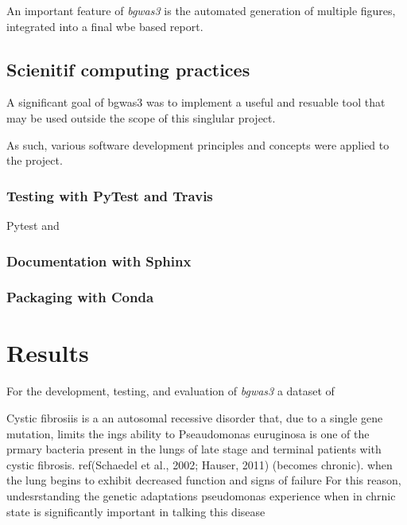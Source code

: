 \documentclass[]{DissertateUSU}
\begin{document}
An important feature of \emph{bgwas3} is the automated generation of
multiple figures, integrated into a final wbe based report.

\hypertarget{scienitif-computing-practices}{%
\subsection{Scienitif computing
practices}\label{scienitif-computing-practices}}

A significant goal of bgwas3 was to implement a useful and resuable tool
that may be used outside the scope of this singlular project.

As such, various software development principles and concepts were
applied to the project.

\hypertarget{testing-with-pytest-and-travis}{%
\subsubsection{Testing with PyTest and
Travis}\label{testing-with-pytest-and-travis}}

Pytest and

\hypertarget{documentation-with-sphinx}{%
\subsubsection{Documentation with
Sphinx}\label{documentation-with-sphinx}}

\hypertarget{packaging-with-conda}{%
\subsubsection{Packaging with Conda}\label{packaging-with-conda}}

\hypertarget{results}{%
\section{Results}\label{results}}

For the development, testing, and evaluation of \emph{bgwas3} a dataset
of

Cystic fibrosiis is a an autosomal recessive disorder that, due to a
single gene mutation, limits the ings ability to Pseaudomonas euruginosa
is one of the prmary bacteria present in the lungs of late stage and
terminal patients with cystic fibrosis. ref(Schaedel et al., 2002;
Hauser, 2011) (becomes chronic). when the lung begins to exhibit
decreased function and signs of failure For this reason, undesrstanding
the genetic adaptations pseudomonas experience when in chrnic state is
significantly important in talking this disease
\end{document}
